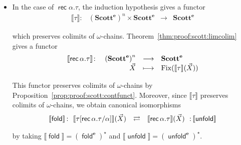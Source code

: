\documentclass[%
  a4paper,
  UKenglish,
  cleveref,
  autoref,
  thm-restate,
  numberwithinsect,
]{lipics-v2021}
\newcommand\longto\longrightarrow
\newcommand\pl{\mathord{-}}	%
\newcommand\copair[1]{{\lbrack #1 \rbrack}}
\newcommand\I[1]{\llbracket #1 \rrbracket} %
\newcommand\ladj[1]{\ensuremath{{#1}^{\star}}}	%
\newcommand\Fix{\mathop{\mathrm{Fix}}}
\newcommand\Scott{\mathbf{Scott}}
\newcommand\term[1]{\mathsf{#1}}
\newcommand\type[1]{\term{#1}}
\newcommand\cse{\term{case}}
\newcommand\inj{\mathop{\term{in}}}
\newcommand\fold{\mathop{\term{fold}}}
\newcommand\unfold{\mathop{\term{unfold}}}
\newcommand\rec{\mathop{\type{rec}}}	%
\newcommand\TV{\alpha}		%
\newcommand\PT{\tau}		%
\newcommand\PTbis{\sigma}	%
\newcommand\ep{{\mathbf{e}}}
\begin{document}
\begin{itemize}
Moreover,
we let $\I{\inj_1} \colon \I\PT(\vec X) \to \I\PT(\vec X) + \I\PTbis(\vec X)$
and $\I{\inj_2} \colon \I\PTbis(\vec X) \to \I\PT(\vec X) + \I\PTbis(\vec X)$
be the morphisms $\inj_1$ and $\inj_2$ defined in~\S\ref{sec:proof:sem:pure:sum}.

Further, the terms
$\cse\ M\ \copair{x_1 \mapsto N_1 \mid x_2 \mapsto N_2}$
are interpreted using the operation
$\copair{\pl, \pl}$, also defined in~\S\ref{sec:proof:sem:pure:sum}.

\item
In the case of $\rec \TV.\PT$,
the induction hypothesis gives a functor
\[
\begin{array}{*{4}{l}}
  \I\PT \colon
& \left( \Scott^\ep \right)^{n} \times \Scott^\ep
& \longto
& \Scott^\ep
\end{array}
\]

\noindent
which preserves colimits of $\omega$-chains.
Theorem~\ref{thm:proof:scott:limcolim}
gives a functor
\[
\begin{array}{l r c l}
  \I{\rec \TV.\PT} \colon
& \left( \Scott^\ep \right)^{n} 
& \longto
& \Scott^\ep
\\
%
& \vec X
& \longmapsto
& \Fix (\I{\PT}(\vec X))
\end{array}
\]

\noindent
This functor preserves colimits of $\omega$-chains by
Proposition~\ref{prop:proof:scott:contfunct}.
%
Moreover, since $\I\PT$ preserves
colimits of $\omega$-chains,
we obtain canonical isomorphisms
\[
\begin{array}{l @{\,:~~} l l l @{~~:\,} l}
  \I\fold
& \I{\PT[\rec \TV.\PT/\TV]}(\vec X)
& \rightleftarrows
& \I{\rec \TV.\PT}(\vec X)
& \I\unfold
\end{array}
\]

\noindent
by taking
$\I\fold = \ladj{(\fold^\ep)}$
and
$\I\unfold = \ladj{(\unfold^\ep)}$.
\end{itemize}
\end{document}
